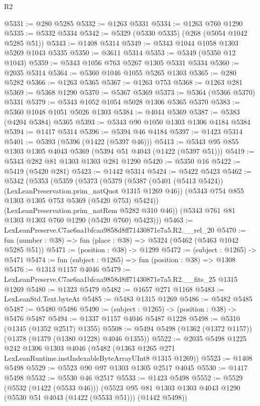 \begin{lexlean}{R2}
\begin{coremodule}
@5331 := @280 @5285
@5332 := @1263 @5331
@5334 := @1263 @760 @1290
@5335 := @5332 @5334
@5342 := @5329 (@5330 @5335) (@268 (@5054 @1042 @5285 @51))
@5343 := @1408 @5314
@5349 := @5343 @1044 @1058 @1303 @5269 @1043 @5335
@5350 := @3611 @5314
@5353 := @5349 (@5350 @12 @1043)
@5359 := @5343 @1056 @763 @5267 @1305 @5331 @5334
@5360 := @2035 @5314
@5364 := @5360 @1046 @1055 @5265 @1303
@5365 := @280 @5282
@5366 := @1263 @5365
@5367 := @1263 @753
@5368 := @1263 @281
@5369 := @5368 @1290
@5370 := @5367 @5369
@5373 := @5364 (@5366 @5370) @5331
@5379 := @5343 @1052 @1054 @5028 @1306 @5365 @5370
@5383 := @5360 @1048 @1051 @5026 @1303
@5384 := @4044 @5369
@5387 := @5383 (@4204 @5384) @5365
@5393 := @5343 @90 @1050 @1303 @1306 @4184 @5384
@5394 := @1417 @5314
@5396 := @5394 @46 @4184
@5397 := @1423 @5314
@5401 := @5393 (@5396 (@1422 (@5397 @46)))
@5413 := @5343 @95 @855 @1303 @1305 @4043 @5369 (@5394 @51 @4043 (@1422 (@5397 @51)))
@5419 := @5343 @282 @81 @1303 @1303 @281 @1290
@5420 := @5350 @16
@5422 := @5419 (@5420 @281)
@5423 := @1442 @5314
@5424 := @5422 @5423
@5462 := @5342
    (@5353
      (@5359
        (@5373
          (@5379
            (@5387 (@5401 (@5413 @5424)) (LexLeanPreservation.prim_natQuot @1315 @1269 @46))
            (@5343 @754 @855 @1303 @1305 @753 @5369 (@5420 @753) @5424))
          (LexLeanPreservation.prim_natRem @5282 @310 @46))
        (@5343 @761 @81 @1303 @1303 @760 @1290 (@5420 @760) @5423)))
@5463 := LexLeanPreserve.C7ae6aa1bfcaa9858d8ff71430871e7a5.R2.__rel_20
@5470 := fun (number : @38) => fun (place : @38) => @5324 (@5462 (@5463 @1042 @5285 @51))
@5471 := (position : @38) -> @1299
@5472 := (subject : @1265) -> @5471
@5474 := fun (subject : @1265) => fun (position : @38) => @1308
@5476 := @1313 @1157 @4046
@5479 := LexLeanPreserve.C7ae6aa1bfcaa9858d8ff71430871e7a5.R2.__fits_25 @1315 @1269
@5480 := @1323 @5479
@5482 := @1657 @271 @1168
@5483 := LexLeanStd.Text.byteAt
@5485 := @5483 @1315 @1269
@5486 := @5482 @5485
@5487 := @5480 @5486
@5490 := (subject : @1265) -> (position : @38) -> @5476 @5487
@5494 := @1337 @1157 @4046 @5487 @1228
@5498 := @5310 (@1345 (@1352 @2517) @1355)
@5508 := @5494 @5498 (@1362 (@1372 @1157)) (@1378 (@1379 (@1380 @1228) @4046 @1355))
@5522 := @2035
    @5498
    @1225
    @242
    @1306
    @1303
    @4046
    (@5482 (@1363 @1265 @271 LexLeanRuntime.instIndexableByteArrayUInt8 @1315 @1269))
@5523 := @1408 @5498
@5529 := @5523 @90 @97 @1303 @1305 @2517 @4045
@5530 := @1417 @5498
@5532 := @5530 @46 @2517
@5533 := @1423 @5498
@5552 := @5529
    (@5532 (@1422 (@5533 @46)))
    (@5523 @95 @81 @1303 @1303 @4043 @1290 (@5530 @51 @4043 (@1422 (@5533 @51))) (@1442 @5498))

\end{coremodule}
\end{lexlean}

